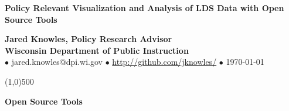 \documentclass{article}
\begin{document}
\setcounter{page}{0}
\thispagestyle{empty}
\begin{center}

\Large \textbf{Policy Relevant Visualization and Analysis of LDS Data with Open Source Tools} \\
\vspace{.15in}

\normalsize \textbf{Jared Knowles, Policy Research Advisor} \\
\vspace{6pt}
\normalsize \textbf{Wisconsin Department of Public Instruction} \\
\vspace{6pt}
\scriptsize $\bullet$ jared.knowles@dpi.wi.gov $\bullet$ \href{http://github.com/jknowles/}{http://github.com/jknowles/} $\bullet$ \today \\
\end{center}

\line(1,0){500}

\vspace{.05in}

\textbf{Open Source Tools}
\end{document}
